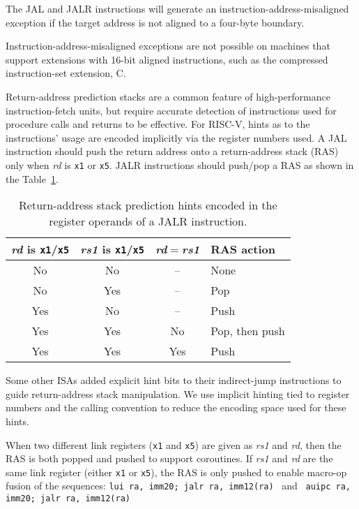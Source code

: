 The JAL and JALR instructions will generate an
instruction-address-misaligned exception if the target address is not
aligned to a four-byte boundary.

\begin{commentary}
Instruction-address-misaligned exceptions are not possible on machines
that support extensions with 16-bit aligned instructions, such as the
compressed instruction-set extension, C.
\end{commentary}

Return-address prediction stacks are a common feature of
high-performance instruction-fetch units, but require accurate
detection of instructions used for procedure calls and returns to be
effective.  For RISC-V, hints as to the instructions' usage are encoded
implicitly via the register numbers used.  A JAL instruction should
push the return address onto a return-address stack (RAS) only when
{\em rd} is {\tt x1} or {\tt x5}.  JALR instructions should push/pop a
RAS as shown in the Table~\ref{rashints}.
\begin{table}[hbt]
\centering
\begin{tabular}{|c|c|c|l|}
  \hline
  \textit{rd} is \texttt{x1}/\texttt{x5}
      & \textit{rs1} is \texttt{x1}/\texttt{x5}
            & \textit{rd}$=$\textit{rs1} & RAS action \\
  \hline
  No  & No  & --  & None \\
  No  & Yes & --  & Pop \\
  Yes & No  & --  & Push \\
  Yes & Yes & No  & Pop, then push \\
  Yes & Yes & Yes & Push \\
   \hline
\end{tabular}
\caption{Return-address stack prediction hints encoded in the register
  operands of a JALR instruction.}
\label{rashints}
\end{table}

\begin{commentary}
Some other ISAs added explicit hint bits to their indirect-jump instructions
to guide return-address stack manipulation.  We use implicit hinting tied to
register numbers and the calling convention to reduce the encoding space used
for these hints.

When two different link registers ({\tt x1} and {\tt x5}) are given as
{\em rs1} and {\em rd}, then the RAS is both popped and pushed to
support coroutines.  If {\em rs1} and {\em rd} are the same link
register (either {\tt x1} or {\tt x5}), the RAS is only pushed to
enable macro-op fusion of the sequences:\linebreak
{\tt lui ra, imm20; jalr ra, imm12(ra)} \ and \ 
{\tt auipc ra, imm20; jalr ra, imm12(ra)}
\end{commentary}

